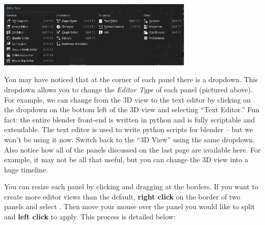\documentclass[11pt]{article}
\begin{document}
\begin{center}
    \includegraphics[width=0.7\textwidth]{editor-type-dropdown}
\end{center}
You may have noticed that at the corner of each panel there is a dropdown.  This dropdown allows
you to change the \textit{Editor Type} of each panel (pictured above).  For example, we can change from the 3D view 
to the text editor by clicking on the dropdown on the bottom left of the 3D view and selecting ``Text 
Editor.''  Fun fact: the entire blender front-end is written in python and is fully scriptable and
extendable.  The text editor is used to write python scripts for blender -- but we won't be using it
now.  Switch back to the ``3D View'' using the same dropdown.  Also notice how all of the panels
discussed on the last page are available here.  For example, it may not be all that useful, but you 
can change the 3D view into a huge timeline.

You can resize each panel by clicking and dragging at the borders.  If you want to create more editor
views than the default, \textbf{right click} on the border of two panels and select .
Then move your mouse over the panel you would like to split and \textbf{left click} to apply.  This
process is detailed below:
\end{document}
